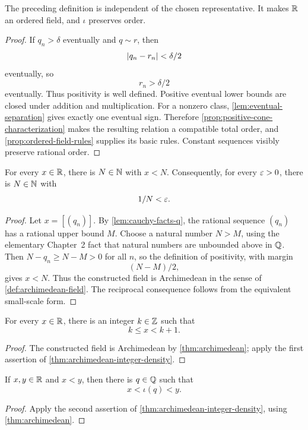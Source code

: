 \begin{lemma}
\label{lem:real-order}
The preceding definition is independent of the chosen representative. It makes $\mathbb{R}$ an ordered field, and $\iota$ preserves order.
\end{lemma}
\begin{proof}
If $q_n>\delta$ eventually and $q\sim r$, then
\[
\lvert q_n-r_n\rvert<\delta/2
\]
 eventually, so
\[
r_n>\delta/2
\]
 eventually. Thus positivity is well defined. Positive eventual lower bounds are closed under addition and multiplication. For a nonzero class, \cref{lem:eventual-separation} gives exactly one eventual sign. Therefore \cref{prop:positive-cone-characterization} makes the resulting relation a compatible total order, and \cref{prop:ordered-field-rules} supplies its basic rules. Constant sequences visibly preserve rational order.
\end{proof}

\begin{theorem}
\label{thm:archimedean}
For every $x\in\mathbb{R}$, there is $N\in\mathbb{N}$ with $x<N$. Consequently, for every $\varepsilon>0$, there is $N\in\mathbb{N}$ with
\[
1/N<\varepsilon.
\]

\end{theorem}
\begin{proof}
Let $x=[(q_n)]$. By \cref{lem:cauchy-facts-q}, the rational sequence $(q_n)$ has a rational upper bound $M$. Choose a natural number $N>M$, using the elementary Chapter~2 fact that natural numbers are unbounded above in $\mathbb{Q}$. Then $N-q_n\geq N-M>0$ for all $n$, so the definition of positivity, with margin
\[
(N-M)/2,
\]
 gives $x<N$. Thus the constructed field is Archimedean in the sense of \cref{def:archimedean-field}. The reciprocal consequence follows from the equivalent small-scale form.
\end{proof}

\begin{lemma}
\label{lem:integer-part}
For every $x\in\mathbb{R}$, there is an integer $k\in\mathbb{Z}$ such that
\[
k\leq x<k+1.
\]
\end{lemma}
\begin{proof}
The constructed field is Archimedean by \cref{thm:archimedean}; apply the
first assertion of \cref{thm:archimedean-integer-density}.
\end{proof}

\begin{theorem}
\label{thm:rational-density}
If $x,y\in\mathbb{R}$ and $x<y$, then there is $q\in\mathbb{Q}$ such that
\[
x<\iota(q)<y.
\]
\end{theorem}
\begin{proof}
Apply the second assertion of \cref{thm:archimedean-integer-density}, using
\cref{thm:archimedean}.
\end{proof}

